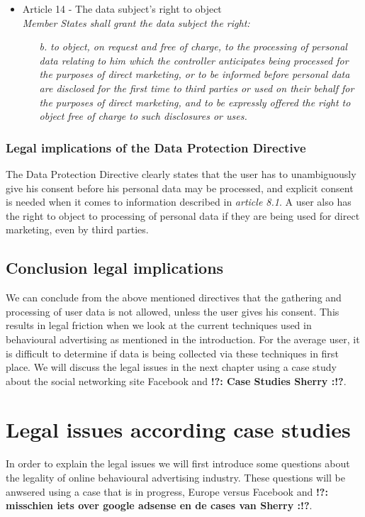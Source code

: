 \documentclass[11pt]{article}
\newcommand{\tocheck}[1]{{\bf !?: #1 :!?}}
\newcommand{\oba}{online behavioural advertising }
\newcommand{\DPD}{Data Protection Directive }
\begin{document}
\begin{itemize}
\begin{itemize}
		\end{itemize}

	\item Article 14 - The data subject's right to object\\
		\emph{Member States shall grant the data subject the right:}
		\begin{itemize}
			\item  [\textit{b.}] {\it to object, on request and free of charge, to the processing of personal data relating to him which the controller anticipates being processed for the purposes of direct marketing, or to be informed before personal data are disclosed for the first time to third parties or used on their behalf for the purposes of direct marketing, and to be expressly offered the right to object free of charge to such disclosures or uses.}
		\end{itemize}
		

\end{itemize}

\subsubsection{Legal implications of the \DPD}
The \DPD clearly states that the user has to unambiguously give his consent before his personal data may be processed, and explicit consent is needed when it comes to information described in \textit{article 8.1}. A user also has the right to object to processing of personal data if they are being used for direct marketing, even by third parties.

\subsection{Conclusion legal implications}

We can conclude from the above mentioned directives that the gathering and processing of user data is not allowed, unless the user gives his consent. This results in legal friction when we look at the current techniques used in behavioural advertising as mentioned in the introduction. For the average user, it is difficult to determine if data is being collected via these techniques in first place. We will discuss the legal issues in the next chapter using a case study about the social networking site Facebook and \tocheck{Case Studies Sherry}.


\section{Legal issues according case studies}
In order to explain the legal issues we will first introduce some questions about the legality of \oba industry. These questions will be anwsered using a case that is in progress, Europe versus Facebook and \tocheck{misschien iets over google adsense en de cases van Sherry}.
\end{document}
